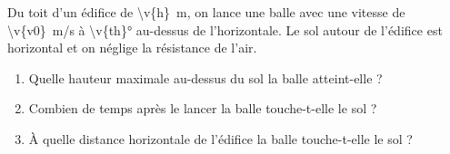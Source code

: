 Du toit d'un édifice de \qty{\v{h}}{m}, on lance une balle avec une vitesse de \qty{\v{v0}}{m/s} à \ang{\v{th}} au-dessus de l'horizontale. Le sol autour de l'édifice est horizontal et on néglige la résistance de l'air.

\begin{enumerate}[label=\alph*)]
    \item Quelle hauteur maximale au-dessus du sol la balle atteint-elle ?
    \item Combien de temps après le lancer la balle touche-t-elle le sol ?
    \item À quelle distance horizontale de l'édifice la balle touche-t-elle le sol ?
\end{enumerate}
